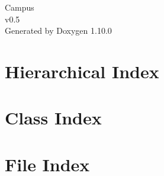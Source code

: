 \documentclass[twoside]{book}
\newcommand{\+}{\discretionary{\mbox{\scriptsize$\hookleftarrow$}}{}{}}
\newcommand{\clearemptydoublepage}{%
    \newpage{\pagestyle{empty}\cleardoublepage}%
  }
\begin{document}
  \raggedbottom
    \hypersetup{pageanchor=false,
                bookmarksnumbered=true,
                pdfencoding=unicode
               }
  \begin{titlepage}
  \vspace*{7cm}
  \begin{center}%
  {\Large Campus}\\
  [1ex]\large v0.\+5 \\
  \vspace*{1cm}
  {\large Generated by Doxygen 1.10.0}\\
  \end{center}
  \end{titlepage}
  \clearemptydoublepage
  \tableofcontents
  \clearemptydoublepage
  \hypersetup{pageanchor=true}
\chapter{Hierarchical Index}

\chapter{Class Index}

\chapter{File Index}

\end{document}
